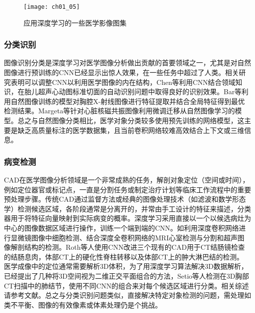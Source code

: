 \begin{figure}[!htbp]
    \centering
    \texttt{[image: ch01\_05]}
   \caption{应用深度学习的一些医学影像图集}
   \label{fig:ch01_05}
\end{figure}

\subsubsection{分类识别}

图像识别分类是深度学习对医学图像分析做出贡献的首要领域之一，尤其是对自然图像进行预训练的CNN已经显示出惊人效果，在一些任务中超过了人类。相关研究表明可以调整CNN以利用医学图像的内在结构，Chen等\citep{Chen2015}利用CNN结合领域知识，在胎儿超声心动图标准切面的自动识别问题中取得良好的识别效果。Bar等\citep{Bar2015Chest}利用自然图像训练的模型对胸腔X-射线图像进行特征提取并结合全局特征\citep{Oliva2001}得到最优检测结果。Margeta等\citep{Margeta2015}针对心脏核磁共振图像利用微调迁移从自然图像学习的模型。总之与自然图像分类相比，医学对象分类较多使用预先训练的网络模型，这主要是缺乏高质量标注的医学数据集，且当前卷积网络较难高效结合上下文或三维信息。

\subsubsection{病变检测} 

CAD在医学图像分析领域是一个非常成熟的任务，解剖对象定位（空间或时间），例如定位器官或标记点，一直是分割任务或制定治疗计划等临床工作流程中的重要预处理步骤。传统CAD\citep{Van2011Computer}通过监督方法或经典的图像处理技术（如滤波和数学形态学）检测候选区域，各阶段通常是分离开的，并常由手工设计的特征来描述，分类器用于将特征向量映射到实际病变的概率。深度学习采用直接以一个以候选病灶为中心的图像数据区域进行操作，训练一个端到端的CNN。如利用深度卷积网络进行显微镜图像中细胞检测\citep{Akram2016}、结合深度全卷积网络的MRI心室检测与分割\citep{Emad2015,Tran2016a}和超声图像解剖结构的检测\citep{Chen2016i}。Roth等人\citep{Roth2016}使用CNN改进三个现有的CAD用于CT结肠镜检查的结肠息肉，体部CT上的硬化性脊柱转移以及体部CT上的肿大淋巴结的检测。
医学成像中的定位通常需要解析3D体积，为了用深度学习算法解决3D数据解析，已经提出了几种将3D空间视为二维正交平面组合的方法，Setio等人\citep{Setio2016Pulmonary}检测在3D胸部CT扫描中的肺结节，使用不同CNN的组合来对每个候选区域进行分类。相关综述请参考文献\citep{Shin2016}。总之与分类识别问题类似，直接解决特定对象检测的问题，需处理如类不平衡、图像的有效像素或体素处理仍是个挑战。

